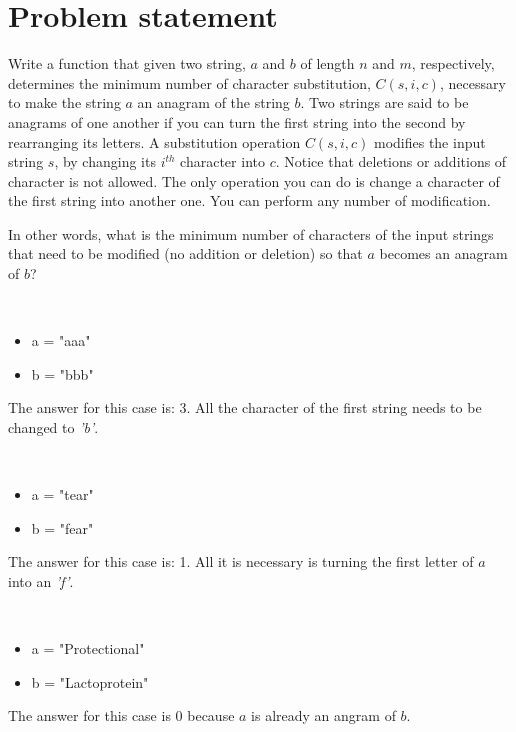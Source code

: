 \section{Problem statement}
	\begin{exercise}
	Write a function that given two string, $a$ and $b$ of length $n$ and $m$, respectively, determines the minimum
	number of character substitution, $C(s, i, c)$, necessary to make the string $a$ an anagram of the string $b$.
	Two strings are said to be anagrams of one another if you can turn the first string into the second by
	rearranging its letters. A substitution operation $C(s,i,c)$ modifies the input string $s$, by changing its $i^{th}$ character
	into $c$. Notice that deletions or additions of character is not allowed. The only operation you can do is change a character of the first string into another one. 
	You can perform any number of modification.

	In other words, what is the minimum number of  characters of the input strings that need to be
	modified (no addition or deletion)  so that $a$ becomes an anagram of $b$?

	\begin{example}
		\hfill \\
		\begin{itemize}
			\item[] 	a = "aaa"
			\item[] 	b = "bbb"
		\end{itemize}
		The answer for this case is: 3. All the character of the first string needs to be changed to \textit{'b'}.
		\label{ex:anagrams:example1}
	\end{example}

	\begin{example}
		\hfill \\
		\begin{itemize}
			\item[] 	a = "tear"
			\item[] 	b = "fear"
		\end{itemize}
		The answer for this case is: 1. All it is necessary is turning the first letter of $a$ into an \textit{'f'}.
		
	\end{example}

	\begin{example}
		\hfill \\
		\begin{itemize}
			\item[] 	a = "Protectional"
			\item[] 	b = "Lactoprotein"
		\end{itemize}
		The answer for this case is $0$ because $a$ is already an angram of $b$.
	\end{example}
\end{exercise}

